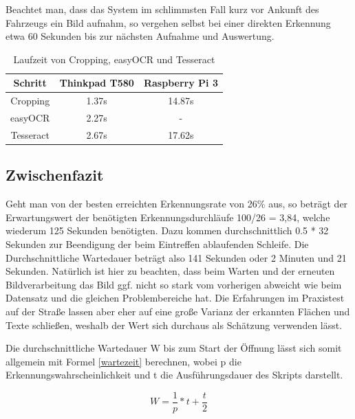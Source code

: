 Beachtet man, dass das System im schlimmsten Fall kurz vor Ankunft des Fahrzeugs ein Bild aufnahm, so vergehen selbst bei einer direkten Erkennung etwa 60 Sekunden bis zur nächsten Aufnahme und Auswertung. 

				
\begin{table}[h]
	\begin{center}
	\begin{tabular}{ c | c | c }
	
	Schritt & Thinkpad T580 & Raspberry Pi 3 \\
	\hline
	Cropping & 1.37s & 14.87s \\
	easyOCR & 2.27s & - \\
	Tesseract & 2.67s & 17.62s \\
	
	\end{tabular}
	\caption{Laufzeit von Cropping, easyOCR und Tesseract}
	\label{Tabelle:2}
	\end{center}
\end{table}			   
							 	   

\subsection{Zwischenfazit}
Geht man von der besten erreichten Erkennungsrate von 26\% aus, so beträgt der Erwartungswert der benötigten Erkennungsdurchläufe 100/26 = 3,84, welche wiederum 125 Sekunden benötigten. Dazu kommen durchschnittlich 0.5 * 32 Sekunden zur Beendigung der beim Eintreffen ablaufenden Schleife. Die Durchschnittliche Wartedauer beträgt also 141 Sekunden oder 2 Minuten und 21 Sekunden. 
\newline Natürlich ist hier zu beachten, dass beim Warten und der erneuten Bildverarbeitung das Bild ggf. nicht so stark vom vorherigen abweicht wie beim Datensatz und die gleichen Problembereiche hat. Die Erfahrungen im Praxistest auf der Straße lassen aber eher auf eine große Varianz der erkannten Flächen und Texte schließen, weshalb der Wert sich durchaus als Schätzung verwenden lässt.

Die durchschnittliche Wartedauer W bis zum Start der Öffnung lässt sich somit allgemein mit  Formel \ref{wartezeit} berechnen, wobei p die Erkennungswahrscheinlichkeit und t die Ausführungsdauer des Skripts darstellt.

\begin{equation}
	W=\frac{1}{p} * t + \frac{t}{2}
\label{wartezeit}
\end{equation}